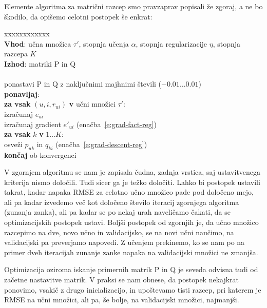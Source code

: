 Elemente algoritma za matrični razcep smo pravzaprav popisali že zgoraj, a ne bo škodilo, da opišemo celotni postopek še enkrat:

\begin{tabbing}
xxx\=xxx\=xxx\=xxx \kill\\
{\bf Vhod}: učna množica $\tau'$, stopnja učenja $\alpha$, stopnja regularizacije $\eta$, stopnja razcepa $K$ \\
{\bf Izhod}: matriki P in Q \\
\\
ponastavi P in Q z naključnimi majhnimi števili ($-0.01\ldots 0.01$) \\
{\bf ponavljaj}: \\
\> {\bf za vsak} $(u,i,r_{ui})$ {\bf v} učni množici $\tau'$:\\
\>\> izračunaj $e_{ui}$\\
\>\> izračunaj gradient $e'_{ui}$ (enačba~\ref{e:grad-fact-reg})\\
\>\> {\bf za vsak} $k$ {\bf v} $1\ldots K$:\\
\>\>\> osveži $p_{uk}$ in $q_{ki}$ (enačba~\ref{e:grad-descent-reg})\\
\> {\bf končaj} ob konvergenci\\
\end{tabbing}

V zgornjem algoritmu se nam je zapisala čudna, zadnja vrstica, saj ustavitvenega kriterija nismo določili. Tudi sicer ga je težko določiti. Lahko bi postopek ustavili takrat, kadar napaka RMSE za celotno učno množico pade pod določeno mejo, ali pa kadar izvedemo več kot določeno število iteracij zgornjega algoritma (zunanja zanka), ali pa kadar se po nekaj urah naveličamo čakati, da se optimizacijskih postopek ustavi. Boljši postopek od zgornjih je, da učno množico razcepimo na dve, novo učno in validacijsko, se na novi učni naučimo, na validacijski pa preverjamo napovedi. Z učenjem prekinemo, ko se nam po na primer dveh iteracijah zunanje zanke napaka na validacijski množici ne zmanjša.

Optimizacija oziroma iskanje primernih matrik P in Q je seveda odvisna tudi od začetne nastavitve matrik. V praksi se nam obnese, da postopek nekajkrat ponovimo, vsakič z drugo inicializacijo, in upoštevamo tisti razcep, pri katerem je RMSE na učni množici, ali pa, še bolje, na validacijski množici, najmanjši.
